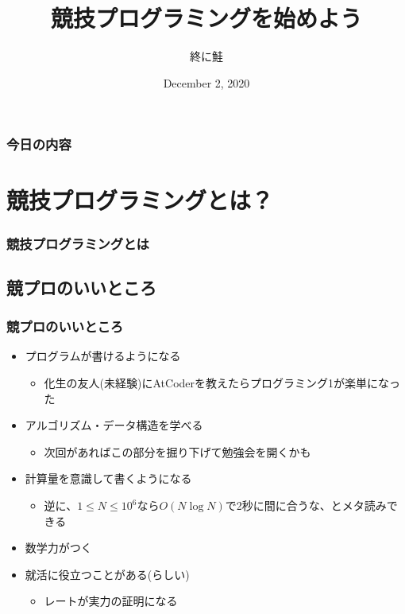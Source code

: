 \documentclass[t, aspectratio=169, dvipdfmx]{beamer}
\title[競プロ体験会]{競技プログラミングを始めよう}
\author{終に鮭}
\institute[OUCRC]{電子計算機研究会}
\date[12/2]{December 2, 2020}
\begin{document}
\frame{\titlepage}

\begin{frame}
  \frametitle{今日の内容}
  \begin{multicols}{2}
    \tableofcontents
  \end{multicols}
\end{frame}

\section{競技プログラミングとは？}
\frame{\sectionpage}

\begin{frame}[c]
  \frametitle{競技プログラミングとは}
\end{frame}

\subsection{競プロのいいところ}
\begin{frame}
  \frametitle{競プロのいいところ}
  \begin{itemize}
    \item プログラムが書けるようになる
    \begin{itemize}
      \item 化生の友人(未経験)にAtCoderを教えたらプログラミング1が楽単になった
    \end{itemize}
    \item アルゴリズム・データ構造を学べる
    \begin{itemize}
      \item 次回があればこの部分を掘り下げて勉強会を開くかも
    \end{itemize}
    \item 計算量を意識して書くようになる
    \begin{itemize}
      \item 逆に、$1 \leq N \leq 10^6$なら$O(N \log N)$で2秒に間に合うな、とメタ読みできる
    \end{itemize}
    \item 数学力がつく
    \item 就活に役立つことがある(らしい)
    \begin{itemize}
      \item レートが実力の証明になる
    \end{itemize}
  \end{itemize}
\end{frame}
\end{document}
